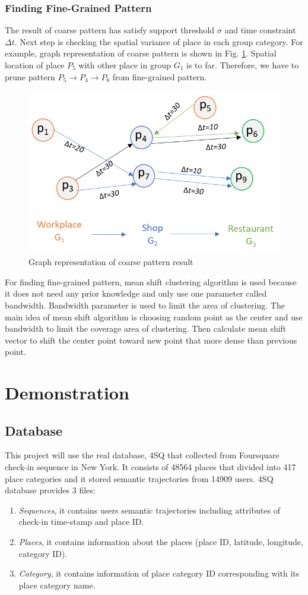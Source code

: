 \documentclass[conference]{IEEEtran}
\begin{document}
\subsubsection{Finding Fine-Grained Pattern}
The result of coarse pattern has satisfy support threshold $\sigma$ and time constraint $\Delta t$. Next step is checking the spatial variance of place in each group category. For example, graph representation of coarse pattern is shown in Fig. \ref{fig:graph-coarse-pattern}. Spatial location of place $P_{5}$ with other place in group $G_{1}$ is to far. Therefore, we have to prune pattern $P_{5}\rightarrow P_{4}\rightarrow P_{6}$ from fine-grained pattern. 
\begin{figure}[!ht]
	\centering
	\includegraphics[width=0.7\linewidth]{graph_coarse_pattern}
	\caption{Graph representation of coarse pattern result}
	\label{fig:graph-coarse-pattern}
\end{figure}
For finding fine-grained pattern, mean shift clustering algorithm is used because it does not need any prior knowledge and only use one parameter called bandwidth. Bandwidth parameter is used to limit the area of clustering. The main idea of mean shift algorithm is choosing random point as the center and use bandwidth to limit the coverage area of clustering. Then calculate mean shift vector to shift the center point toward new point that more dense than previous point. 

\section{Demonstration}

\subsection{Database}
This project will use the real database, 4SQ that collected from Foursquare check-in sequence in New York. It consists of 48564 places that divided into 417 place categories and it stored semantic trajectories from 14909 users. 4SQ database provides 3 files:
\begin{enumerate}
\item \textit{Sequences}, it contains users semantic trajectories including attributes of check-in time-stamp and place ID.
\item \textit{Places}, it contains information about the places (place ID, latitude, longitude, category ID).
\item \textit{Category}, it contains information of place category ID corresponding with its place category name.
\end{enumerate}
\end{document}
